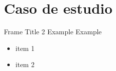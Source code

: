 \documentclass[aspectratio=1610]{beamer}
\begin{document}


\section {Caso de estudio}
\begin{frame}{Frame Title 2}
  Example Example

\begin{itemize}
    \item item 1
    \item item 2
\end{itemize}

\end{frame}
\end{document}
